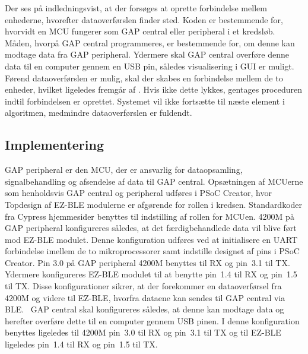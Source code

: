 Der ses på  indledningsvist, at der forsøges at oprette forbindelse mellem enhederne, hvorefter dataoverførslen finder sted. Koden er bestemmende for, hvorvidt en MCU fungerer som GAP central eller peripheral i et kredsløb. Måden, hvorpå GAP central programmeres, er bestemmende for, om denne kan modtage data fra GAP peripheral. Ydermere skal GAP central overføre denne data til en computer gennem en USB pin, således visualisering i GUI er muligt. \newline
Førend dataoverførslen er mulig, skal der skabes en forbindelse mellem de to enheder, hvilket ligeledes fremgår af . Hvis ikke dette lykkes, gentages proceduren indtil forbindelsen er oprettet. Systemet vil ikke fortsætte til næste element i algoritmen, medmindre dataoverførslen er fuldendt.  

\subsection{Implementering}
GAP peripheral er den MCU, der er ansvarlig for dataopsamling, signalbehandling og afsendelse af data til GAP central. Opsætningen af MCUerne som henholdsvis GAP central og peripheral udføres i PSoC Creator, hvor Topdesign af EZ-BLE modulerne er afgørende for rollen i kredsen. Standardkoder fra Cypress hjemmesider benyttes til indstilling af rollen for MCUen. \newline
4200M på GAP peripheral konfigureres således, at det færdigbehandlede data vil blive ført mod EZ-BLE modulet. Denne konfiguration udføres ved at initialisere en UART forbindelse imellem de to mikroprocessorer samt indstille designet af pins i PSoC Creator.
Pin 3.0 på GAP peripheral 4200M benyttes til RX og pin~3.1 til TX. Ydermere konfigureres EZ-BLE modulet til at benytte pin~1.4 til RX og pin~1.5 til TX. Disse konfigurationer sikrer, at der forekommer en dataoverførsel fra 4200M og videre til EZ-BLE, hvorfra dataene kan sendes til GAP central via BLE.~\citep{Semiconductor20164200M} \newline
GAP central skal konfigureres således, at denne kan modtage data og herefter overføre dette til en computer gennem USB pinen. I denne konfiguration benyttes ligeledes til 4200M pin~3.0 til RX og pin~3.1 til TX og til EZ-BLE ligeledes pin~1.4 til RX og pin~1.5 til TX.

